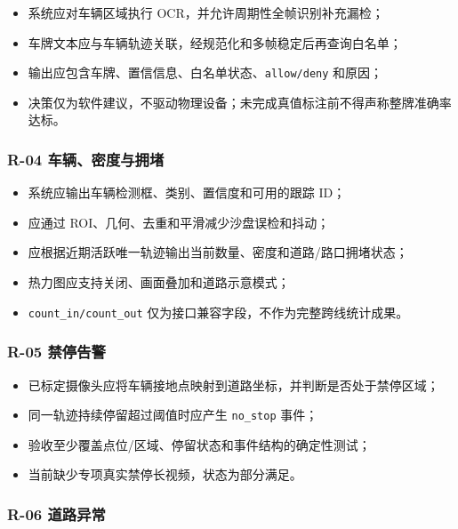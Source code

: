 \begin{itemize}
\tightlist
\item
  系统应对车辆区域执行 OCR，并允许周期性全帧识别补充漏检；
\item
  车牌文本应与车辆轨迹关联，经规范化和多帧稳定后再查询白名单；
\item
  输出应包含车牌、置信信息、白名单状态、\texttt{allow/\allowbreak{}deny} 和原因；
\item
  决策仅为软件建议，不驱动物理设备；未完成真值标注前不得声称整牌准确率达标。
\end{itemize}

\subsubsection{R-04 车辆、密度与拥堵}\label{requirements-r-04-ux8f66ux8f86ux5bc6ux5ea6ux4e0eux62e5ux5835}

\begin{itemize}
\tightlist
\item
  系统应输出车辆检测框、类别、置信度和可用的跟踪 ID；
\item
  应通过 ROI、几何、去重和平滑减少沙盘误检和抖动；
\item
  应根据近期活跃唯一轨迹输出当前数量、密度和道路/路口拥堵状态；
\item
  热力图应支持关闭、画面叠加和道路示意模式；
\item
  \texttt{count\_\allowbreak{}in/\allowbreak{}count\_\allowbreak{}out} 仅为接口兼容字段，不作为完整跨线统计成果。
\end{itemize}

\subsubsection{R-05 禁停告警}\label{requirements-r-05-ux7981ux505cux544aux8b66}

\begin{itemize}
\tightlist
\item
  已标定摄像头应将车辆接地点映射到道路坐标，并判断是否处于禁停区域；
\item
  同一轨迹持续停留超过阈值时应产生 \texttt{no\_\allowbreak{}stop} 事件；
\item
  验收至少覆盖点位/区域、停留状态和事件结构的确定性测试；
\item
  当前缺少专项真实禁停长视频，状态为部分满足。
\end{itemize}

\subsubsection{R-06 道路异常}\label{requirements-r-06-ux9053ux8defux5f02ux5e38}

